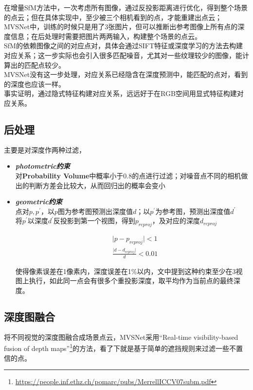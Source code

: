 	在增量SfM方法中，一次考虑所有图像，通过反投影距离进行优化，得到整个场景的点云；但在具体实现中，至少被三个相机看到的点，才能重建出点云；\\

	MVSNet中，训练的时候只是用了3张图片，但可以推断出参考图像上所有点的深度信息；在后处理时需要把图片两两输入，构建整个场景的点云。\\

	SfM的依赖图像之间的对应点对，具体会通过SIFT特征或深度学习的方法去构建对应关系；这一步实际也会引入很多匹配噪音，尤其对一些纹理较少的图像，能计算出的匹配点较少。\\

	MVSNet没有这一步处理，对应关系已经隐含在深度预测中，能匹配的点对，看到的深度也应该一样。\\

	事实证明，通过隐式特征构建对应关系，远远好于在RGB空间用显式特征构建对应关系。

\subsection{后处理}
	主要是对深度作两种过滤，

	\begin{itemize}
		\item \textbf{\textit{photometric约束}} \\

		对\textbf{Probability Volume}中概率小于0.8的点进行过滤；对噪音点不同的相机做出的判断方差会比较大，从而回归出的概率会变小

		\item \textbf{\textit{geometric约束}} \\
			
			点对$p,p^\prime$，以$p$图为参考图预测出深度值$d$；以$p^\prime$为参考图，预测出深度值$d^\prime$\\

			将$p^\prime$以深度$d^\prime$反投影到第一个视图，得到$p_{reproj}$，及对应的深度$d_{reproj}$

		\begin{align*}
			&\vert p - p_{reproj}| < 1\\
			&\frac{\vert d - d_{reproj}\vert}{d} < 0.01
		\end{align*}
		
		使得像素误差在1像素内，深度误差在1\%以内，文中提到这种约束至少在3视图上执行，如此同一点会有很多个重投影深度，取平均作为当前点的最终深度。
	\end{itemize}

\subsection{深度图融合}
	将不同视觉的深度图融合成场景点云，MVSNet采用“Real-time visibility-based fusion of depth maps”\footnote{\url{https://people.inf.ethz.ch/pomarc/pubs/MerrellICCV07subm.pdf}}的方法，看了下就是基于简单的遮挡规则来过滤一些不置信的点。\\

